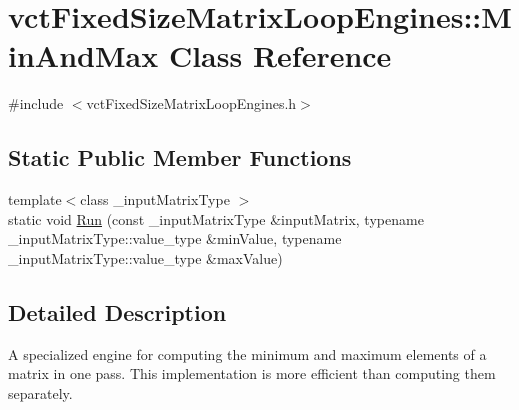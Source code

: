 \hypertarget{classvct_fixed_size_matrix_loop_engines_1_1_min_and_max}{\section{vct\-Fixed\-Size\-Matrix\-Loop\-Engines\-:\-:Min\-And\-Max Class Reference}
\label{classvct_fixed_size_matrix_loop_engines_1_1_min_and_max}
}


{\ttfamily \#include $<$vct\-Fixed\-Size\-Matrix\-Loop\-Engines.\-h$>$}

\subsection*{Static Public Member Functions}
\begin{DoxyCompactItemize}
\item 
{\footnotesize template$<$class \-\_\-input\-Matrix\-Type $>$ }\\static void \hyperlink{classvct_fixed_size_matrix_loop_engines_1_1_min_and_max_ac741cdb4fecf6e19498d59b7d9ee6354}{Run} (const \-\_\-input\-Matrix\-Type \&input\-Matrix, typename \-\_\-input\-Matrix\-Type\-::value\-\_\-type \&min\-Value, typename \-\_\-input\-Matrix\-Type\-::value\-\_\-type \&max\-Value)
\end{DoxyCompactItemize}


\subsection{Detailed Description}
A specialized engine for computing the minimum and maximum elements of a matrix in one pass. This implementation is more efficient than computing them separately. 


